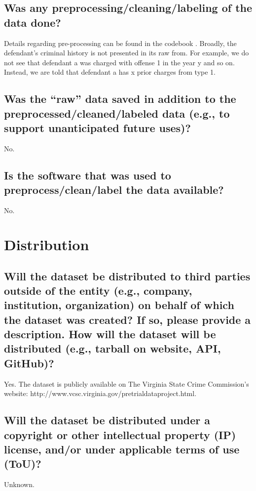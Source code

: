 \documentclass[letterpaper, 10 pt, conference]{ieeeconf}  %
\begin{document}
\subsection{Was any preprocessing/cleaning/labeling of the data done?}

Details regarding pre-processing can be found in the codebook \cite{codebook}. Broadly, the defendant's criminal history is not presented in its raw from. For example, we do not see that defendant a was charged with offense 1 in the year y and so on. Instead, we are told that defendant a has x prior charges from type 1. 

\subsection{Was the “raw” data saved in addition to the preprocessed/cleaned/labeled data (e.g., to support unanticipated future uses)?}

No.

\subsection{Is the software that was used to preprocess/clean/label the data available?}

No.

\section{Distribution}
\subsection{Will the dataset be distributed to third parties outside of the entity (e.g., company, institution, organization) on behalf of which the dataset was created? If so, please provide a description. How will the dataset will be distributed (e.g., tarball on website, API, GitHub)?}

Yes. The dataset is publicly available on The Virginia State Crime Commission's website: http://www.vcsc.virginia.gov/pretrialdataproject.html.


\subsection{Will the dataset be distributed under a copyright or other intellectual property (IP) license, and/or under applicable terms of use (ToU)?}

Unknown. 
\end{document}

